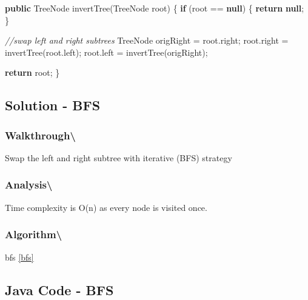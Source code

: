 \documentclass[]{book}
\newenvironment{Shaded}{\begin{snugshade}}{\end{snugshade}}
\newcommand{\BuiltInTok}[1]{#1}
\newcommand{\CommentTok}[1]{\textcolor[rgb]{0.56,0.35,0.01}{\textit{#1}}}
\newcommand{\FunctionTok}[1]{\textcolor[rgb]{0.00,0.00,0.00}{#1}}
\newcommand{\KeywordTok}[1]{\textcolor[rgb]{0.13,0.29,0.53}{\textbf{#1}}}
\newcommand{\NormalTok}[1]{#1}
\begin{document}
\begin{Shaded}
\begin{Highlighting}[]
\KeywordTok{public} \BuiltInTok{TreeNode} \FunctionTok{invertTree}\NormalTok{(}\BuiltInTok{TreeNode}\NormalTok{ root) \{}
    \KeywordTok{if}\NormalTok{ (root == }\KeywordTok{null}\NormalTok{) \{}
        \KeywordTok{return} \KeywordTok{null}\NormalTok{;}
\NormalTok{    \}}

    \CommentTok{//swap left and right subtrees}
    \BuiltInTok{TreeNode}\NormalTok{ origRight = root.}\FunctionTok{right}\NormalTok{;}
\NormalTok{    root.}\FunctionTok{right}\NormalTok{ = }\FunctionTok{invertTree}\NormalTok{(root.}\FunctionTok{left}\NormalTok{);}
\NormalTok{    root.}\FunctionTok{left}\NormalTok{ = }\FunctionTok{invertTree}\NormalTok{(origRight);}

    \KeywordTok{return}\NormalTok{ root;}
\NormalTok{\}}
\end{Highlighting}
\end{Shaded}

\hypertarget{solution---bfs}{%
\subsection{Solution - BFS}\label{solution---bfs}}

\hypertarget{walkthrough-52}{%
\subsubsection{Walkthrough\textbackslash{}}\label{walkthrough-52}}

Swap the left and right subtree with iterative (BFS) strategy

\hypertarget{analysis-59}{%
\subsubsection{Analysis\textbackslash{}}\label{analysis-59}}

Time complexity is O(n) as every node is visited once.

\hypertarget{algorithm-61}{%
\subsubsection{Algorithm\textbackslash{}}\label{algorithm-61}}

bfs \ref{bfs}

\hypertarget{java-code---bfs}{%
\subsection{Java Code - BFS}\label{java-code---bfs}}
\end{document}
